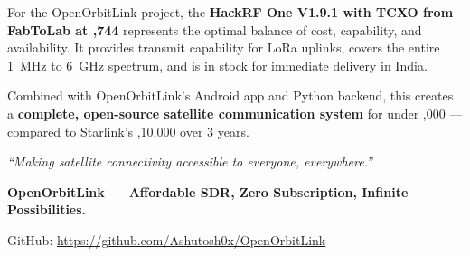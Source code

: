 \documentclass[12pt,a4paper]{article}
\begin{document}
For the OpenOrbitLink project, the \textbf{HackRF One V1.9.1 with TCXO from FabToLab 
at ,744} represents the optimal balance of cost, capability, and availability. 
It provides transmit capability for LoRa uplinks, covers the entire 1~MHz to 6~GHz 
spectrum, and is in stock for immediate delivery in India.

Combined with OpenOrbitLink's Android app and Python backend, this creates a 
\textbf{complete, open-source satellite communication system} for under ,000 
--- compared to Starlink's ,10,000 over 3 years.

\vspace{0.5cm}
\begin{center}
    \textit{``Making satellite connectivity accessible to everyone, everywhere.''}
    
    \textbf{OpenOrbitLink --- Affordable SDR, Zero Subscription, Infinite Possibilities.}
    
    \vspace{0.3cm}
    \small{GitHub: \url{https://github.com/Ashutosh0x/OpenOrbitLink}}
\end{center}
\end{document}
